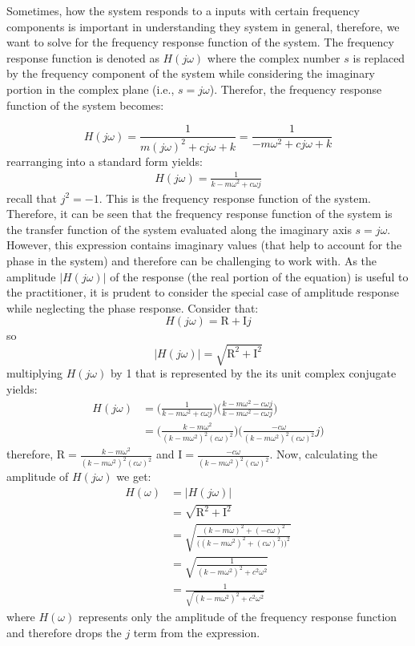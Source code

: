 \documentclass[12pt,letter]{article}
\numberwithin{ex}{section} %
\numberwithin{re}{section} %
\numberwithin{equation}{section}	%
\begin{document}
Sometimes, how the system responds to a inputs with certain frequency components is important in understanding they system in general, therefore, we want to solve for the frequency response function of the system. The frequency response function is denoted as $H(j\omega)$ where the complex number $s$ is replaced by the frequency component of the system while considering the imaginary portion in the complex plane (i.e., $s = j\omega$). Therefor, the frequency response function of the system becomes:

\begin{equation}
H(j\omega) = \frac{1}{m(j\omega)^2+cj\omega+k} = \frac{1}{-m\omega^2+cj\omega+k} 
\end{equation}
rearranging into a standard form yields:
\begin{eqnarray}
H(j\omega) = \frac{1}{k-m\omega^2+c\omega j}
\label{eq:frequency_response_function}
\end{eqnarray}
recall that $j^2=-1$. This is the frequency response function of the system. Therefore, it can be seen that the frequency response function of the system is the transfer function of the system evaluated along the imaginary axis $s=j\omega$. However, this expression contains imaginary values (that help to account for the phase in the system) and therefore can be challenging to work with. As the amplitude $|H(j\omega)|$ of the response (the real portion of the equation) is useful to the practitioner, it is prudent to consider the special case of amplitude response while neglecting the phase response. Consider that:
\begin{equation}
	H(j\omega) = \text{R}+\text{I}j
\end{equation}  
so
\begin{equation}
	 |H(j\omega)|=\sqrt{\text{R}^2+\text{I}^2}
\end{equation}  
multiplying $H(j\omega)$ by 1 that is represented by the its unit complex conjugate yields:
\begin{align}
H(j\omega) &= \bigg( \frac{1}{k-m\omega^2+c\omega j} \bigg) \bigg( \frac{k-m\omega^2-c\omega j}{k-m\omega^2-c\omega j}\bigg)  \\
&= \bigg( \frac{k-m\omega^2}{(k-m\omega^2)^2(c\omega)^2} \bigg) \bigg( \frac{-c\omega}{(k-m\omega^2)^2(c\omega)^2}j\bigg)  \nonumber
\end{align}
therefore, $\text{R} = \frac{k-m\omega^2}{(k-m\omega^2)^2(c\omega)^2} $ and $\text{I} = \frac{-c\omega}{(k-m\omega^2)^2(c\omega)^2}$. Now, calculating the amplitude of $H(j\omega)$ we get:
\begin{align}
H(\omega) &= |H(j\omega)|  \\
&=  \sqrt{\text{R}^2+\text{I}^2} \nonumber  \\
&=  \sqrt{\frac{(k-m\omega)^2+(-c\omega)^2}{\big((k-m\omega^2)^2+(c\omega)^2)\big)^2}}  \nonumber \\
&=  \sqrt{\frac{1}{(k-m\omega^2)^2+c^2\omega^2}}  \nonumber \\
&= \frac{1}{\sqrt{(k-m\omega^2)^2+c^2\omega^2}}  \nonumber
\end{align}
where $H(\omega)$ represents only the amplitude of the frequency response function and therefore drops the $j$ term from the expression. 
\end{document}
